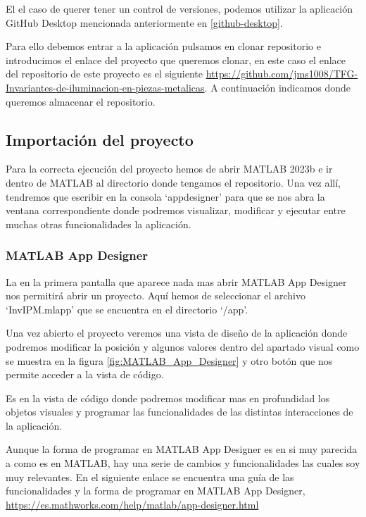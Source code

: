 El el caso de querer tener un control de versiones, podemos utilizar la aplicación GitHub Desktop mencionada anteriormente en \ref{github-desktop}.

Para ello debemos entrar a la aplicación pulsamos en clonar repositorio e introducimos el enlace del proyecto que queremos clonar, en este caso el enlace del repositorio de este proyecto es el siguiente \url{https://github.com/jms1008/TFG-Invariantes-de-iluminacion-en-piezas-metalicas}. A continuación indicamos donde queremos almacenar el repositorio.

\subsection{Importación del proyecto}\label{importación-del-proyecto}

Para la correcta ejecución del proyecto hemos de abrir MATLAB 2023b e ir dentro de MATLAB al directorio donde tengamos el repositorio. Una vez allí, tendremos que escribir en la consola `appdesigner' para que se nos abra la ventana correspondiente donde podremos visualizar, modificar y ejecutar entre muchas otras funcionalidades la aplicación.

\subsubsection{MATLAB App Designer}\label{matlab-app-designer}

La en la primera pantalla que aparece nada mas abrir MATLAB App Designer nos permitirá abrir un proyecto. Aquí hemos de seleccionar el archivo `InvIPM.mlapp' que se encuentra en el directorio `/app'.

Una vez abierto el proyecto veremos una vista de diseño de la aplicación donde podremos modificar la posición y algunos valores dentro del apartado visual como se muestra en la figura \ref{fig:MATLAB_App_Designer} y otro botón que nos permite acceder a la vista de código.


Es en la vista de código donde podremos modificar mas en profundidad los objetos visuales y programar las funcionalidades de las distintas interacciones de la aplicación.

Aunque la forma de programar en MATLAB App Designer es en si muy parecida a como es en MATLAB, hay una serie de cambios y funcionalidades las cuales soy muy relevantes. En el siguiente enlace se encuentra una guía de las funcionalidades y la forma de programar en MATLAB App Designer, \url{https://es.mathworks.com/help/matlab/app-designer.html}

